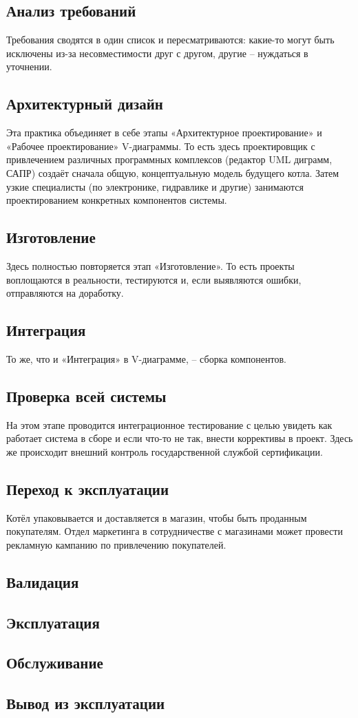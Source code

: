 \documentclass[bibliography=totocnumbered]{scrartcl}
\begin{document}
\subsection{Анализ требований}
Требования сводятся в один список и пересматриваются: какие-то могут быть исключены из-за несовместимости друг с другом, другие -- нуждаться в уточнении.

\subsection{Архитектурный дизайн}
Эта практика объединяет в себе этапы «Архитектурное проектирование» и «Рабочее проектирование» V-диаграммы. То есть здесь проектировщик с привлечением различных программных комплексов (редактор UML диграмм, САПР) создаёт сначала общую, концептуальную модель будущего котла. Затем узкие специалисты (по электронике, гидравлике и другие) занимаются проектированием конкретных компонентов системы.

\subsection{Изготовление}
Здесь полностью повторяется этап «Изготовление». То есть проекты воплощаются в реальности, тестируются и, если выявляются ошибки, отправляются на доработку.

\subsection{Интеграция}
То же, что и «Интеграция» в V-диаграмме, -- сборка компонентов.

\subsection{Проверка всей системы}
На этом этапе проводится интеграционное тестирование с целью увидеть как работает система в сборе и если что-то не так, внести коррективы в проект. Здесь же происходит внешний контроль государственной службой сертификации.

\subsection{Переход к эксплуатации}
Котёл упаковывается и доставляется в магазин, чтобы быть проданным покупателям. Отдел маркетинга в сотрудничестве с магазинами может провести рекламную кампанию по привлечению покупателей.
\subsection{Валидация}
\subsection{Эксплуатация}
\subsection{Обслуживание}
\subsection{Вывод из эксплуатации}
\end{document}
